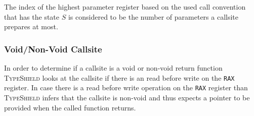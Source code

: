 %
%
%

The index of the highest parameter register based on the used call convention that has the state $S$ is considered to be the number of parameters a callsite prepares at most.

\subsubsection{Void/Non-Void Callsite}
In order to determine if a callsite is a void or non-void return function
\textsc{TypeShield} looks at the callsite if there is an read before write on the \texttt{RAX} register. 
In case there is a read before write operation on the \texttt{RAX} register than
\textsc{TypeShield} infers that the callsite is non-void and thus expects a pointer to be provided 
when the called function returns.

